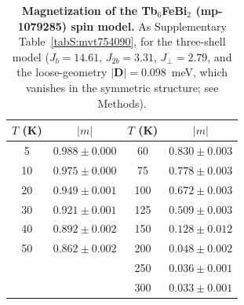 \documentclass[aps,prb,preprint,superscriptaddress,longbibliography,nofootinbib]{revtex4-2}
\begin{document}
\begin{table}[h]
\centering
\caption{\textbf{Magnetization of the Tb$_6$FeBi$_2$ (mp-1079285) spin model.} As Supplementary
Table~\ref{tabS:mvt754090}, for the three-shell model ($J_b=14.61$, $J_{2b}=3.31$, $J_\perp=2.79$,
and the loose-geometry $|\mathbf{D}|=0.098$~meV, which vanishes in the symmetric structure; see Methods).}
\label{tabS:mvt1079285}
\begin{tabular}{cccc}
\toprule
$T$ (K) & $|m|$ & $T$ (K) & $|m|$ \\
\midrule
5   & $0.988\pm0.000$ & 60  & $0.830\pm0.003$ \\
10  & $0.975\pm0.000$ & 75  & $0.778\pm0.003$ \\
20  & $0.949\pm0.001$ & 100 & $0.672\pm0.003$ \\
30  & $0.921\pm0.001$ & 125 & $0.509\pm0.003$ \\
40  & $0.892\pm0.002$ & 150 & $0.128\pm0.012$ \\
50  & $0.862\pm0.002$ & 200 & $0.048\pm0.002$ \\
    &                 & 250 & $0.036\pm0.001$ \\
    &                 & 300 & $0.033\pm0.001$ \\
\bottomrule
\end{tabular}
\end{table}
\end{document}
